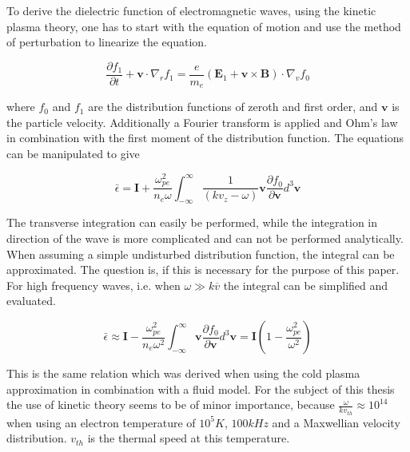 \documentclass[draft,ras]{agutex}
\begin{document}
\begin{article}
To derive the dielectric function of electromagnetic waves, using the kinetic plasma theory, one has to start with the equation of motion and use the method of perturbation to linearize the equation.

\begin{equation}\label{eq:vlasov_full_linearized}
\frac{\partial f_1}{\partial t} + \mathbf{v}\cdot
\nabla_r f_1=\frac{e}{m_e}\left( \mathbf{E}_1+\mathbf{v} \times \mathbf{B}\right) \cdot \nabla_v f_0
\end{equation}

where $f_0$ and $f_1$ are the distribution functions of zeroth and first order, and $\mathbf{v}$ is the particle velocity. Additionally a Fourier transform is applied and Ohm's law in combination with the first moment of the distribution function. The equations can be manipulated to give



\begin{equation}
\bar{\epsilon} =\mathbf{I} +  \frac{\omega_{pe}^2}{n_e  \omega}  \int_{-\infty}^{\infty} \frac{1}{ (k  v_z-\omega)}\mathbf{v} \frac{\partial f_0}{\partial \mathbf{v}} d^3 \mathbf{v}
\end{equation}

The transverse integration can easily be performed, while the integration in direction of the wave is more complicated and can not be performed analytically. When assuming a simple undisturbed distribution function, the integral can be approximated. The question is, if this is necessary for the purpose of this paper. \\

For high frequency waves, i.e. when $\omega \gg k\overline{v}$ the integral can be simplified and evaluated.

\begin{equation}
\bar{\epsilon} \approx \mathbf{I} -  \frac{\omega_{pe}^2}{n_e  \omega^2}  \int_{-\infty}^{\infty} \mathbf{v} \frac{\partial f_0}{\partial \mathbf{v}} d^3 \mathbf{v}=\mathbf{I}\left( 1 -  \frac{\omega_{pe}^2}{  \omega^2}\right)
\end{equation}

This is the same relation which was derived when using the cold plasma approximation in combination with a fluid model. For the subject of this thesis the use of kinetic theory seems to be of minor importance, because $\frac{\omega}{kv_{th}}\approx 10^{14}$ when using an electron temperature of $10^5K$, $100kHz$ and a Maxwellian velocity distribution. $v_{th}$ is the thermal speed at this temperature. \\


\end{article}
\end{document}
